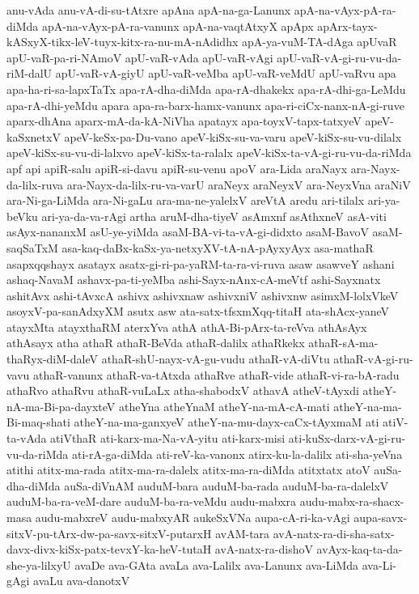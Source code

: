 {anu-vAda
anu-vA-di-su-tAtxre
apAna
apA-na-ga-Lanunx
apA-na-vAyx-pA-ra-diMda
apA-na-vAyx-pA-ra-vanunx
apA-na-vaqtAtxyX
apApx
apArx-tayx-kASxyX-tikx-leV-tuyx-kitx-ra-nu-mA-nAdidhx
apA-ya-vuM-TA-dAga
apUvaR
apU-vaR-pa-ri-NAmoV
apU-vaR-vAda
apU-vaR-vAgi
apU-vaR-vA-gi-ru-vu-da-riM-dalU
apU-vaR-vA-giyU
apU-vaR-veMba
apU-vaR-veMdU
apU-vaRvu
apa
apa-ha-ri-sa-lapxTaTx
apa-rA-dha-diMda
apa-rA-dhakekx
apa-rA-dhi-ga-LeMdu
apa-rA-dhi-yeMdu
apara
apa-ra-barx-hamx-vanunx
apa-ri-ciCx-nanx-nA-gi-ruve
aparx-dhAna
aparx-mA-da-kA-NiVha
apatayx
apa-toyxV-tapx-tatxyeV
apeV-kaSxnetxV
apeV-keSx-pa-Du-vano
apeV-kiSx-su-va-varu
apeV-kiSx-su-vu-dilalx
apeV-kiSx-su-vu-di-lalxvo
apeV-kiSx-ta-ralalx
apeV-kiSx-ta-vA-gi-ru-vu-da-riMda
apf
api
apiR-salu
apiR-si-davu
apiR-su-venu
apoV
ara-Lida
araNayx
ara-Nayx-da-lilx-ruva
ara-Nayx-da-lilx-ru-va-varU
araNeyx
araNeyxV
ara-NeyxVna
araNiV
ara-Ni-ga-LiMda
ara-Ni-gaLu
ara-ma-ne-yalelxV
areVtA
aredu
ari-tilalx
ari-ya-beVku
ari-ya-da-va-rAgi
artha
aruM-dha-tiyeV
asAmxnf
asAthxneV
asA-viti
asAyx-nananxM
asU-ye-yiMda
asaM-BA-vi-ta-vA-gi-didxto
asaM-BavoV
asaM-saqSaTxM
asa-kaq-daBx-kaSx-ya-netxyXV-tA-nA-pAyxyAyx
asa-mathaR
asapxqqshayx
asatayx
asatx-gi-ri-pa-yaRM-ta-ra-vi-ruva
asaw
asawveY
ashani
ashaq-NavaM
ashavx-pa-ti-yeMba
ashi-Sayx-nAnx-cA-meVtf
ashi-Sayxnatx
ashitAvx
ashi-tAvxcA
ashivx
ashivxnaw
ashivxniV
ashivxnw
asimxM-lolxVkeV
asoyxV-pa-sanAdxyXM
asutx
asw
ata-satx-tfsxmXqq-titaH
ata-shAcx-yaneV
atayxMta
atayxthaRM
aterxYva
athA
athA-Bi-pArx-ta-reVva
athAsAyx
athAsayx
atha
athaR
athaR-BeVda
athaR-dalilx
athaRkekx
athaR-sA-ma-thaRyx-diM-daleV
athaR-shU-nayx-vA-gu-vudu
athaR-vA-diVtu
athaR-vA-gi-ru-vavu
athaR-vanunx
athaR-va-tAtxda
athaRve
athaR-vide
athaR-vi-ra-bA-radu
athaRvo
athaRvu
athaR-vuLaLx
atha-shabodxV
athavA
atheV-tAyxdi
atheY-nA-ma-Bi-pa-dayxteV
atheYna
atheYnaM
atheY-na-mA-cA-mati
atheY-na-ma-Bi-maq-shati
atheY-na-ma-ganxyeV
atheY-na-mu-dayx-caCx-tAyxmaM
ati
atiV-ta-vAda
atiVthaR
ati-karx-ma-Na-vA-yitu
ati-karx-misi
ati-kuSx-darx-vA-gi-ru-vu-da-riMda
ati-rA-ga-diMda
ati-reV-ka-vanonx
atirx-ku-la-dalilx
ati-sha-yeVna
atithi
atitx-ma-rada
atitx-ma-ra-dalelx
atitx-ma-ra-diMda
atitxtatx
atoV
auSa-dha-diMda
auSa-diVnAM
auduM-bara
auduM-ba-rada
auduM-ba-ra-dalelxV
auduM-ba-ra-veM-dare
auduM-ba-ra-veMdu
audu-mabxra
audu-mabx-ra-shacx-masa
audu-mabxreV
audu-mabxyAR
aukeSxVNa
aupa-cA-ri-ka-vAgi
aupa-savx-sitxV-pu-tArx-dw-pa-savx-sitxV-putarxH
avAM-tara
avA-natx-ra-di-sha-satx-davx-divx-kiSx-patx-tevxY-ka-heV-tutaH
avA-natx-ra-dishoV
avAyx-kaq-ta-da-she-ya-lilxyU
avaDe
ava-GAta
avaLa
ava-Lalilx
ava-Lanunx
ava-LiMda
ava-Li-gAgi
avaLu
ava-danotxV
}
